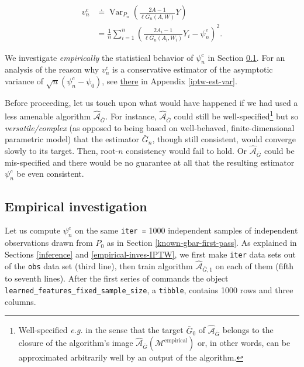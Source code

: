 \documentclass[11pt,openright,twoside]{book}
\DeclareMathOperator{\Var}{Var}
\newcommand{\Algo}{\widehat{\mathcal{A}}}
\newcommand{\defq}{\doteq}
\newcommand{\calM}{\mathcal{M}}
\newcommand{\Gbar}{\bar{G}}
\theoremstyle{definition}
\theoremstyle{definition}
\theoremstyle{definition}
\theoremstyle{remark}
\begin{document}
\begin{align*}            v_{n}^{c}            &\defq            \Var_{P_{n}}
\left(\frac{2A-1}{\ell\Gbar_{n}(A,W)}Y\right)      \\      &=      \frac{1}{n}
\sum_{i=1}^{n}\left(\frac{2A_{i}-1}{\ell\Gbar_{n}   (A_{i},W_{i})}   Y_{i}   -
\psi_{n}^{c}\right)^{2}.  \end{align*}

We investigate \emph{empirically} the statistical behavior of \(\psi_{n}^{c}\) in
Section \ref{empirical-inves-IPTW-bis}. For an analysis of the reason why
\(v_{n}^{c}\) is a conservative estimator of the asymptotic variance of
\(\sqrt{n} (\psi_{n}^{c} - \psi_{0})\), see \protect\hyperlink{iptw-est-var}{there} in Appendix
\ref{iptw-est-var}.

Before proceeding, let us touch upon what would have happened if we had used a
less amenable algorithm \(\Algo_{\Gbar}\). For instance, \(\Algo_{\Gbar}\) could
still be well-specified\footnote{Well-specified \emph{e.g.} in the sense that the target
  \(\Gbar_{0}\) of \(\Algo_{\Gbar}\) belongs to the closure of the algorithm's image
  \(\Algo_{\Gbar}(\calM^{\text{empirical}})\) or, in other words, can be
  approximated arbitrarily well by an output of the algorithm.} but so
\emph{versatile/complex} (as opposed to being based on well-behaved,
finite-dimensional parametric model) that the estimator \(\Gbar_{n}\), though
still consistent, would converge slowly to its target. Then, root-\(n\)
consistency would fail to hold. Or \(\Algo_{\Gbar}\) could be
mis-specified and there would be no guarantee at all
that the resulting estimator \(\psi_{n}^{c}\) be even consistent.

\hypertarget{empirical-inves-IPTW-bis}{%
\subsection{Empirical investigation}\label{empirical-inves-IPTW-bis}}

Let us compute \(\psi_{n}^{c}\) on the same \texttt{iter\ =} 1000 independent
samples of independent observations drawn from \(P_{0}\) as in Section
\ref{known-gbar-first-pass}. As explained in Sections \ref{inference} and
\ref{empirical-inves-IPTW}, we first make \texttt{iter} data sets out of the \texttt{obs}
data set (third line), then train algorithm \(\Algo_{\Gbar,1}\) on each of them
(fifth to seventh lines). After the first series of commands the object
\texttt{learned\_features\_fixed\_sample\_size}, a \texttt{tibble}, contains 1000 rows and
three columns.
\end{document}
